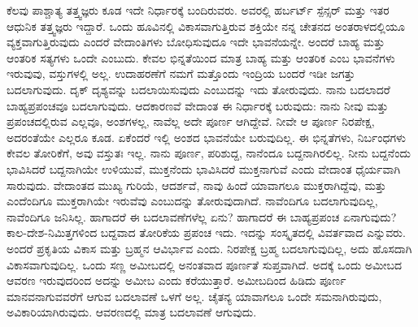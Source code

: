 ಕೆಲವು ಪಾಶ್ಚಾತ್ಯ ತತ್ತ್ವಜ್ಞರು ಕೂಡ ಇದೇ ನಿರ್ಧಾರಕ್ಕೆ ಬಂದಿರುವರು. ಅವರಲ್ಲಿ ಹರ್ಬರ್ಟ್ ಸ್ಪೆನ್ಸರ್ ಮತ್ತು ಇತರ ಆಧುನಿಕ ತತ್ತ್ವಜ್ಞರು ಇದ್ದಾರೆ. ಒಂದು ಹೂವಿನಲ್ಲಿ ವಿಕಾಸವಾಗುತ್ತಿರುವ ಶಕ್ತಿಯೇ ನನ್ನ ಚೇತನದ ಅಂತರಾಳದಲ್ಲಿಯೂ ವ್ಯಕ್ತವಾಗುತ್ತಿರುವುದು ಎಂದರೆ ವೇದಾಂತಿಗಳು ಬೋಧಿಸುವುದೂ ಇದೇ ಭಾವನೆಯನ್ನೇ. ಅಂದರೆ ಬಾಹ್ಯ ಮತ್ತು ಆಂತರಿಕ ಸತ್ಯಗಳು ಒಂದೇ ಎಂಬುದು. ಕೇವಲ ಭಿನ್ನತೆಯಿಂದ ಮಾತ್ರ ಬಾಹ್ಯ ಮತ್ತು ಆಂತರಿಕ ಎಂಬ ಭಾವನೆಗಳು ಇರುವುವು, ವಸ್ತುಗಳಲ್ಲಿ ಅಲ್ಲ. ಉದಾಹರಣೆಗೆ ನಮಗೆ ಮತ್ತೊಂದು ಇಂದ್ರಿಯ ಬಂದರೆ ಇಡೀ ಜಗತ್ತು ಬದಲಾಗುವುದು. ದೃಕ್ ದೃಶ್ಯವನ್ನು ಬದಲಾಯಿಸುವುದು ಎಂಬುದನ್ನು ಇದು ತೋರುವುದು. ನಾನು ಬದಲಾದರೆ ಬಾಹ್ಯಪ್ರಪಂಚವೂ ಬದಲಾಗುವುದು. ಆದಕಾರಣವೆ ವೇದಾಂತ ಈ ನಿರ್ಧಾರಕ್ಕೆ ಬರುವುದು: ನಾನು ನೀವು ಮತ್ತು ಪ್ರಪಂಚದಲ್ಲಿರುವ ಎಲ್ಲವೂ, ಅಂಶಗಳಲ್ಲ, ನಾವೆಲ್ಲ ಅದೇ ಪೂರ್ಣ ಆಗಿದ್ದೇವೆ. ನೀವೇ ಆ ಪೂರ್ಣ ನಿರಪೇಕ್ಷ, ಅದರಂತೆಯೇ ಎಲ್ಲರೂ ಕೂಡ. ಏಕೆಂದರೆ ಇಲ್ಲಿ ಅಂಶದ ಭಾವನೆಯೇ ಬರುವುದಿಲ್ಲ. ಈ ಭಿನ್ನತೆಗಳು, ನಿರ್ಬಂಧಗಳು ಕೇವಲ ತೋರಿಕೆಗೆ, ಅವು ವಸ್ತುತಃ ಇಲ್ಲ. ನಾನು ಪೂರ್ಣ, ಪರಿಶುದ್ದ, ನಾನೆಂದೂ ಬದ್ದನಾಗಿರಲಿಲ್ಲ. ನೀನು ಬದ್ದನೆಂದು ಭಾವಿಸಿದರೆ ಬದ್ದನಾಗಿಯೇ ಉಳಿಯುವೆ, ಮುಕ್ತನೆಂದು ಭಾವಿಸಿದರೆ ಮುಕ್ತನಾಗುವೆ ಎಂದು ವೇದಾಂತ ಧೈರ್ಯವಾಗಿ ಸಾರುವುದು. ವೇದಾಂತದ ಮುಖ್ಯ ಗುರಿಯೆ, ಆದರ್ಶವೆ, ನಾವು ಹಿಂದೆ ಯಾವಾಗಲೂ ಮುಕ್ತರಾಗಿದ್ದೆವು, ಮತ್ತು ಎಂದೆಂದಿಗೂ ಮುಕ್ತರಾಗಿಯೇ ಇರುವೆವು ಎಂಬುದನ್ನು ತೋರುವುದಾಗಿದೆ. ನಾವೆಂದಿಗೂ ಬದಲಾಗುವುದಿಲ್ಲ, ನಾವೆಂದಿಗೂ ಜನಿಸಿಲ್ಲ. ಹಾಗಾದರೆ ಈ ಬದಲಾವಣೆಗಳೆಲ್ಲ ಏನು? ಹಾಗಾದರೆ ಈ ಬಾಹ್ಯಪ್ರಪಂಚ ಏನಾಗುವುದು? ಕಾಲ-ದೇಶ-ನಿಮಿತ್ತಗಳಿಂದ ಬದ್ದವಾದ ತೋರಿಕೆಯ ಪ್ರಪಂಚ ಇದು. ಇದನ್ನು ಸಂಸ್ಕೃತದಲ್ಲಿ ವಿವರ್ತವಾದ ಎನ್ನುವರು. ಅಂದರೆ ಪ್ರಕೃತಿಯ ವಿಕಾಸ ಮತ್ತು ಬ್ರಹ್ಮನ ಆವಿರ್ಭಾವ ಎಂದು. ನಿರಪೇಕ್ಷ ಬ್ರಹ್ಮ ಬದಲಾಗುವುದಿಲ್ಲ, ಅದು ಹೊಸದಾಗಿ ವಿಕಾಸವಾಗುವುದಿಲ್ಲ. ಒಂದು ಸಣ್ಣ ಅಮೀಬದಲ್ಲಿ ಅನಂತವಾದ ಪೂರ್ಣತೆ ಸುಪ್ತವಾಗಿದೆ. ಅದಕ್ಕೆ ಒಂದು ಅಮೀಬದ ಆವರಣ ಇರುವುದರಿಂದ ಅದನ್ನು ಅಮೀಬ ಎಂದು ಕರೆಯುತ್ತಾರೆ. ಅಮೀಬದಿಂದ ಹಿಡಿದು ಪೂರ್ಣ ಮಾನವನಾಗುವವರೆಗೆ ಆಗುವ ಬದಲಾವಣೆ ಒಳಗೆ ಅಲ್ಲ. ಚೈತನ್ಯ ಯಾವಾಗಲೂ ಒಂದೇ ಸಮನಾಗಿರುವುದು, ಅವಿಕಾರಿಯಾಗಿರುವುದು. ಆವರಣದಲ್ಲಿ ಮಾತ್ರ ಬದಲಾವಣೆ ಆಗುವುದು.

